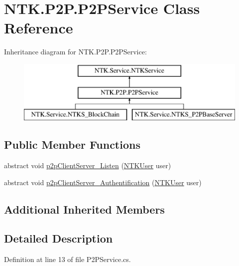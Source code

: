 \hypertarget{class_n_t_k_1_1_p2_p_1_1_p2_p_service}{}\section{N\+T\+K.\+P2\+P.\+P2\+P\+Service Class Reference}
\label{class_n_t_k_1_1_p2_p_1_1_p2_p_service}


 


Inheritance diagram for N\+T\+K.\+P2\+P.\+P2\+P\+Service\+:\begin{figure}[H]
\begin{center}
\leavevmode
\includegraphics[height=3.000000cm]{db/d0f/class_n_t_k_1_1_p2_p_1_1_p2_p_service}
\end{center}
\end{figure}
\subsection*{Public Member Functions}
\begin{DoxyCompactItemize}
\item 
abstract void \mbox{\hyperlink{class_n_t_k_1_1_p2_p_1_1_p2_p_service_ab939632560ab084719e27dfcccea80df}{p2p\+Client\+Server\+\_\+\+Listen}} (\mbox{\hyperlink{class_n_t_k_1_1_n_t_k_user}{N\+T\+K\+User}} user)
\item 
abstract void \mbox{\hyperlink{class_n_t_k_1_1_p2_p_1_1_p2_p_service_ac4adf79dade09cfcbb37a74632cdc6c2}{p2p\+Client\+Server\+\_\+\+Authentification}} (\mbox{\hyperlink{class_n_t_k_1_1_n_t_k_user}{N\+T\+K\+User}} user)
\end{DoxyCompactItemize}
\subsection*{Additional Inherited Members}


\subsection{Detailed Description}




Definition at line 13 of file P2\+P\+Service.\+cs.



